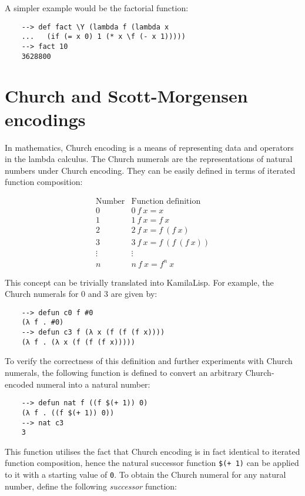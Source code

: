 A simpler example would be the factorial function:

\begin{Verbatim}
    --> def fact \Y (lambda f (lambda x
    ...   (if (= x 0) 1 (* x \f (- x 1)))))
    --> fact 10
    3628800
\end{Verbatim}

\section{Church and Scott-Morgensen encodings}

In mathematics, Church encoding is a means of representing data and operators in the lambda calculus. The Church numerals are the representations of natural numbers under Church encoding. They can be easily defined in terms of iterated function composition:

$$
\begin{array}{r|l}
    {\text{Number}}&{\text{Function definition}}\\
    \hline
    0&0\ f\ x=x\\
    1&1\ f\ x=f\ x\\
    2&2\ f\ x=f\ (f\ x)\\
    3&3\ f\ x=f\ (f\ (f\ x))\\
    \vdots&\vdots \\
    n&n\ f\ x=f^{n}\ x
\end{array}
$$

This concept can be trivially translated into KamilaLisp. For example, the Church numerals for 0 and 3 are given by:

\begin{Verbatim}
    --> defun c0 f #0
    (λ f . #0)
    --> defun c3 f (λ x (f (f (f x))))
    (λ f . (λ x (f (f (f x)))))
\end{Verbatim}

To verify the correctness of this definition and further experiments with Church numerals, the following function is defined to convert an arbitrary Church-encoded numeral into a natural number:

\begin{Verbatim}
    --> defun nat f ((f $(+ 1)) 0)
    (λ f . ((f $(+ 1)) 0))
    --> nat c3
    3
\end{Verbatim}

This function utilises the fact that Church encoding is in fact identical to iterated function composition, hence the natural successor function \verb|$(+ 1)| can be applied to it with a starting value of \verb|0|. To obtain the Church numeral for any natural number, define the following \textit{successor} function:

